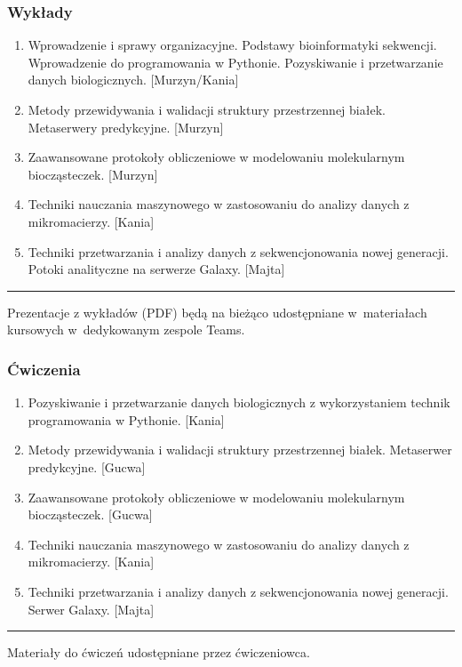 \begin{frame}\frametitle{Wykłady}
\begin{enumerate}\scriptsize
 
 \item Wprowadzenie i sprawy organizacyjne. Podstawy bioinformatyki
 sekwencji. Wprowadzenie do programowania w Pythonie. Pozyskiwanie i
 przetwarzanie danych biologicznych. [Murzyn/Kania]

 \item Metody przewidywania i walidacji struktury przestrzennej
 białek. Metaserwery predykcyjne. [Murzyn]
 
 \item Zaawansowane protokoły obliczeniowe w modelowaniu molekularnym
 biocząsteczek. [Murzyn]

 \item Techniki nauczania maszynowego w zastosowaniu do analizy danych
 z mikromacierzy. [Kania]

 \item Techniki przetwarzania i analizy danych z sekwencjonowania
 nowej generacji. Potoki analityczne na serwerze Galaxy. [Majta]

\end{enumerate}

\centering\rule{.8\textwidth}{.5pt}\scriptsize

Prezentacje z wykładów (PDF) będą na bieżąco udostępniane
w~materiałach kursowych w~dedykowanym zespole
Teams.

\end{frame}


\begin{frame}\frametitle{Ćwiczenia}
\begin{enumerate}\scriptsize
 
 \item Pozyskiwanie i przetwarzanie danych biologicznych z
 wykorzystaniem technik programowania w Pythonie. [Kania]

 \item Metody przewidywania i walidacji struktury przestrzennej
 białek. Metaserwer predykcyjne. [Gucwa]

 \item Zaawansowane protokoły obliczeniowe w modelowaniu molekularnym
 biocząsteczek. [Gucwa]

 \item Techniki nauczania maszynowego w zastosowaniu do analizy danych
 z mikromacierzy. [Kania]

 \item Techniki przetwarzania i analizy danych z sekwencjonowania
 nowej generacji. Serwer Galaxy. [Majta]

\end{enumerate}

\centering\rule{.8\textwidth}{.5pt}\scriptsize

Materiały do ćwiczeń udostępniane przez ćwiczeniowca.

\end{frame}


